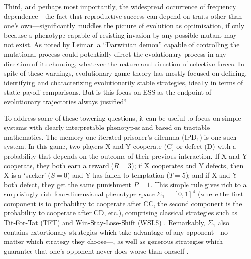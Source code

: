 \documentclass[12pt]{article}
\def\IPD{\textrm{IPD}}
\def\IPD1{\textrm{IPD}_1}
\begin{document}
Third, and perhaps most importantly, the widespread occurrence of frequency dependence---the fact that reproductive success can depend on traits other than one's own---significantly muddles the picture of evolution as optimization, if only because a phenotype capable of resisting invasion by any possible mutant may not exist. As noted by Leimar, a ``Darwinian demon'' capable of controlling the mutational process could potentially direct the evolutionary process in any direction of its choosing, whatever the nature and direction of selective forces. In spite of these warnings, evolutionary game theory has mostly focused on defining, identifying and characterizing evolutionarily stable strategies, ideally in terms of static payoff comparisons. But is this focus on ESS as the endpoint of evolutionary trajectories always justified?   

To address some of these towering questions, it can be useful to focus on simple systems with clearly interpretable phenotypes and based on tractable mathematics. The memory-one iterated prisoner's dilemma ($\IPD1$) is one such system. In this game, two players X and Y cooperate (C) or defect (D) with a probability that depends on the outcome of their previous interaction. If X and Y cooperate, they both earn a reward ($R = 3$); if X cooperates and Y defects, then X is a `sucker' ($S = 0$) and Y has fallen to temptation ($T = 5$); and if X and Y both defect, they get the same punishment $P=1$. This simple rule gives rich to a surprisingly rich four-dimensional phenotype space $\Sigma_1 = [0, 1]^4$ (where the first component is to probability to cooperate after CC, the second component is the probability to cooperate after CD, etc.), comprising classical strategies such as Tit-For-Tat (TFT) and Win-Stay-Lose-Shift (WSLS) \cite{nowak_strategy_1993}. Remarkably, $\Sigma_1$ also contains extortionary strategies which take advantage of any opponent---no matter which strategy they choose---\cite{press_iterated_2012}, as well as generous strategies which guarantee that one's opponent never does worse than oneself \cite{stewart_extortion_2013}.
\end{document}
